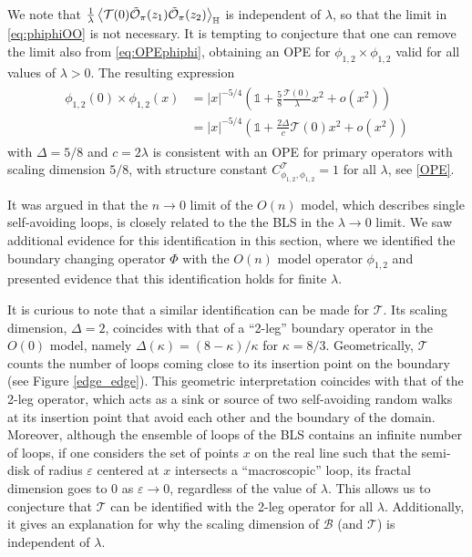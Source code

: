 \documentclass[a4paper,11pt]{article}
\begin{document}
We note that $\frac{1}{\lambda} \Braket{ \mathcal{T}(0) \tilde{\mathcal{O}}_{\pi}(z_1) \tilde{\mathcal{O}}_{\pi}(z_2) }_{\mathbb{H}}$ is independent of $\lambda$, so that the limit in \eqref{eq:phiphiOO} is not necessary. It is tempting to conjecture that one can remove the limit also from \eqref{eq:OPEphiphi}, obtaining an OPE for $\phi_{1,2} \times \phi_{1,2}$ valid for all values of $\lambda>0$. The resulting expression
\begin{align}
\begin{split}
    \phi_{1,2}(0) \times \phi_{1,2}(x) & = \lvert x \rvert^{-5/4} \left( \mathbb{1} + \frac{5}{8} \frac{\mathcal{T}(0)}{\lambda} x^2 + o(x^2) \right) \\
    & = \lvert x \rvert^{-5/4} \left( \mathbb{1} + \frac{2\Delta}{c} \mathcal{T}(0) x^2 + o(x^2) \right)
\end{split}
\end{align}
with $\Delta=5/8$ and $c=2\lambda$ is consistent with an OPE for primary operators with scaling dimension $5/8$, with structure constant $C^{\mathcal{T}}_{\phi_{1,2},\phi_{1,2}}=1$ for all $\lambda$, see \eqref{OPE}.

It was argued in \cite{Camia_2020} that the $n \to 0$ limit of the $O(n)$ model, which describes single self-avoiding loops, is closely related to the the BLS in the $\lambda \to 0$ limit.
We saw additional evidence for this identification in this section, where we identified the boundary changing operator $\Phi$ with the $O(n)$ model operator $\phi_{1,2}$ and presented evidence that this identification holds for finite $\lambda$.

It is curious to note that a similar identification can be made for $\mathcal{T}$. Its scaling dimension, $\Delta = 2$, coincides with that of a ``2-leg'' boundary operator in the $O(0)$ model, namely $\Delta(\kappa) = (8-\kappa)/\kappa$ for $\kappa = 8/3$.
Geometrically, $\mathcal{T}$ counts the number of loops coming close to its insertion point on the boundary (see Figure \ref{edge_edge}). This geometric interpretation coincides with that of the 2-leg operator, which acts as a sink or source of two self-avoiding random walks at its insertion point that avoid each other and the boundary of the domain. Moreover, although the ensemble of loops of the BLS contains an infinite number of loops, if one considers the set of points $x$ on the real line such that the semi-disk of radius $\varepsilon$ centered at $x$ intersects a ``macroscopic'' loop, its fractal dimension goes to $0$ as $\varepsilon \to 0$, regardless of the value of $\lambda$. This allows us to conjecture that $\mathcal{T}$ can be identified with the 2-leg operator for all $\lambda$. Additionally, it gives an explanation for why the scaling dimension of $\mathcal{B}$ (and $\mathcal{T}$) is independent of $\lambda$.
\end{document}
